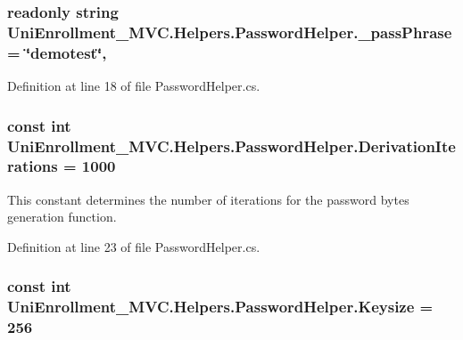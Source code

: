 \subsubsection[{\texorpdfstring{\+\_\+pass\+Phrase}{_passPhrase}}]{\setlength{\rightskip}{0pt plus 5cm}readonly string Uni\+Enrollment\+\_\+\+M\+V\+C.\+Helpers.\+Password\+Helper.\+\_\+pass\+Phrase = \char`\"{}demotest\char`\"{}\hspace{0.3cm}{\ttfamily [static]}, {\ttfamily [private]}}\hypertarget{class_uni_enrollment___m_v_c_1_1_helpers_1_1_password_helper_ab934c88f31054cd8f4ecedf645f35182}{}\label{class_uni_enrollment___m_v_c_1_1_helpers_1_1_password_helper_ab934c88f31054cd8f4ecedf645f35182}


Definition at line 18 of file Password\+Helper.\+cs.

\subsubsection[{\texorpdfstring{Derivation\+Iterations}{DerivationIterations}}]{\setlength{\rightskip}{0pt plus 5cm}const int Uni\+Enrollment\+\_\+\+M\+V\+C.\+Helpers.\+Password\+Helper.\+Derivation\+Iterations = 1000\hspace{0.3cm}{\ttfamily [private]}}\hypertarget{class_uni_enrollment___m_v_c_1_1_helpers_1_1_password_helper_ae0d57bd52b9f42378589365008ecf1e2}{}\label{class_uni_enrollment___m_v_c_1_1_helpers_1_1_password_helper_ae0d57bd52b9f42378589365008ecf1e2}


This constant determines the number of iterations for the password bytes generation function. 



Definition at line 23 of file Password\+Helper.\+cs.

\subsubsection[{\texorpdfstring{Keysize}{Keysize}}]{\setlength{\rightskip}{0pt plus 5cm}const int Uni\+Enrollment\+\_\+\+M\+V\+C.\+Helpers.\+Password\+Helper.\+Keysize = 256\hspace{0.3cm}{\ttfamily [private]}}\hypertarget{class_uni_enrollment___m_v_c_1_1_helpers_1_1_password_helper_adf82ac46ba5e4d73e1177979eb31efc7}{}\label{class_uni_enrollment___m_v_c_1_1_helpers_1_1_password_helper_adf82ac46ba5e4d73e1177979eb31efc7}


